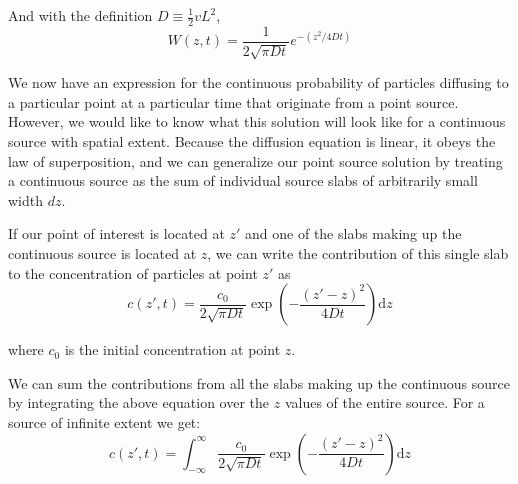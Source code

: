 \documentclass[draft, jgrga]{AGUTeX}
\begin{document}
\begin{article}
And with the definition \begin{math} D \equiv \frac{1}{2} v L^2 \end{math},
\begin{equation}
W(z,t) = \frac{1}{2\sqrt{\pi Dt}}e^{-(z^2/4Dt)}
\end{equation}

We now have an expression for the continuous probability of particles diffusing to a particular point at a particular time that originate from a point source. However, we would like to know what this solution will look like for a continuous source with spatial extent. Because the diffusion equation is linear, it obeys the law of superposition, and we can generalize our point source solution by treating a continuous source as the sum of individual source slabs of arbitrarily small width \begin{math} dz \end{math}.

If our point of interest is located at \begin{math} z' \end{math} and one of the slabs making up the continuous source is located at \begin{math} z \end{math}, we can write the contribution of this single slab to the concentration of particles at point \begin{math} z' \end{math} as
\begin{equation}
c(z',t) = \frac{c_0}{2\sqrt{\pi Dt}} \exp \left(-\frac{(z' -z)^2}{4Dt}\right) \mathrm{d}z
\end{equation}

where \begin{math} c_0 \end{math} is the initial concentration at point \begin{math} z \end{math}.

We can sum the contributions from all the slabs making up the continuous source by integrating the above equation over the \begin{math} z \end{math} values of the entire source. For a source of infinite extent we get:
\begin{equation}
c(z',t) = \int^\infty_{-\infty} \frac{c_0}{2\sqrt{\pi Dt}}
\exp \left(-\frac{(z' -z)^2}{4Dt}\right) \mathrm{d}z
\end{equation}


\end{article}
\end{document}
